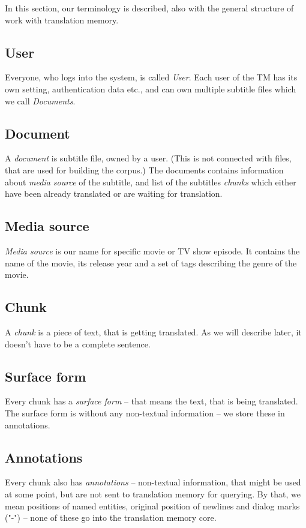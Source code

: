 \label{sec:glossary}

In this section, our terminology is described, also with the general structure of work with translation memory.

\subsection*{User}
Everyone, who logs into the system, is called \emph{User}. Each user of the TM has its own setting, authentication data etc., and can own multiple subtitle files which we call \emph{Documents}.

\subsection*{Document}
A \emph{document} is subtitle file, owned by a user. (This is not connected with files, that are used for building the corpus.) The documents contains information about \emph{media source} of the subtitle, and list of the subtitles \emph{chunks} which either have been already translated or are waiting for translation.

\subsection*{Media source}
\emph{Media source} is our name for specific movie or TV show episode. It contains the name of the movie, its release year and a set of tags describing the genre of the movie.

\subsection*{Chunk}
A \emph{chunk} is a piece of text, that is getting translated. As we will describe later, it doesn't have to be a complete sentence.

\subsection*{Surface form}
Every chunk has a \emph{surface form} -- that means the text, that is being translated. The surface form is without any non-textual information -- we store these in annotations.

\subsection*{Annotations}
Every chunk also has \emph{annotations} -- non-textual information, that might be used at some point, but are not sent to translation memory for querying. By that, we mean positions of named entities, original position of newlines and dialog marks ("-") -- none of these go into the translation memory core.

